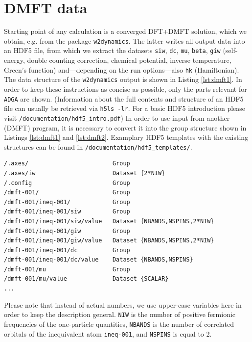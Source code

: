\documentclass[a4paper,11pt]{article}
\numberwithin{equation}{section} %
\begin{document}
\section{DMFT data}
\label{sct:dmftdata}
Starting point of any calculation is a converged DFT+DMFT solution, which we obtain, e.g. from the package
\verb|w2dynamics|. The latter writes all output data into an HDF5 file, from which we extract the datasets \verb|siw|, \verb|dc|, \verb|mu|,
\verb|beta|, \verb|giw| (self-energy, double counting correction, chemical potential, inverse temperature, Green's function)
and---depending on the run options---also \verb|hk| (Hamiltonian).
The data structure of the \verb|w2dynamics| output is shown in Listing \ref{lst:dmft1}.
In order to keep these instructions as concise as possible, only the parts relevant for \verb+ADGA+ are shown.
(Information about the full contents and structure of an HDF5 file can usually be retrieved via  \verb|h5ls -lr|. For a basic HDF5 introduction
please visit  {\color{blue}\verb+/documentation/hdf5_intro.pdf+}) In order to use
input from another (DMFT) program, it is necessary to convert it into the group structure
shown in Listings \ref{lst:dmft1} and \ref{lst:dmft2}.
Examplary HDF5 templates with the existing structures can be found in {\color{blue}\verb+/documentation/hdf5_templates/+}.
\newpage
\begin{lstlisting}[caption=HDF5-structure of the DMFT output, frame=single, basicstyle=\small, label={lst:dmft1}]
/.axes/                        Group
/.axes/iw                      Dataset {2*NIW}
/.config                       Group
/dmft-001/                     Group
/dmft-001/ineq-001/            Group
/dmft-001/ineq-001/siw         Group
/dmft-001/ineq-001/siw/value   Dataset {NBANDS,NSPINS,2*NIW}
/dmft-001/ineq-001/giw         Group
/dmft-001/ineq-001/giw/value   Dataset {NBANDS,NSPINS,2*NIW}
/dmft-001/ineq-001/dc          Group
/dmft-001/ineq-001/dc/value    Dataset {NBANDS,NSPINS}
/dmft-001/mu                   Group
/dmft-001/mu/value             Dataset {SCALAR}
...
\end{lstlisting}
Please note that instead of actual numbers, we use upper-case variables here in order to keep
the description general. \verb|NIW| is the number of positive fermionic frequencies of the one-particle quantities,
\verb|NBANDS| is the number of correlated orbitals of the inequivalent atom \verb|ineq-001|, and \verb|NSPINS| is equal to 2.
\end{document}

